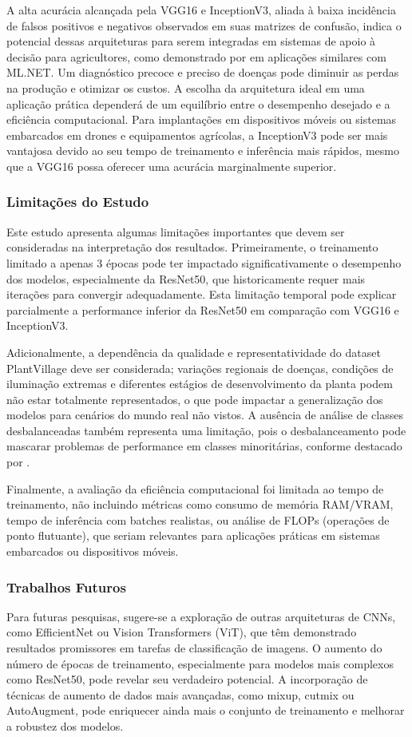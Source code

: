 \documentclass[12pt]{article}
\begin{document}
A alta acurácia alcançada pela VGG16 e InceptionV3, aliada à baixa incidência de falsos positivos e negativos observados em suas matrizes de confusão, indica o potencial dessas arquiteturas para serem integradas em sistemas de apoio à decisão para agricultores, como demonstrado por \cite{tessele2024modelo} em aplicações similares com ML.NET. Um diagnóstico precoce e preciso de doenças pode diminuir as perdas na produção e otimizar os custos. A escolha da arquitetura ideal em uma aplicação prática dependerá de um equilíbrio entre o desempenho desejado e a eficiência computacional. Para implantações em dispositivos móveis ou sistemas embarcados em drones e equipamentos agrícolas, a InceptionV3 pode ser mais vantajosa devido ao seu tempo de treinamento e inferência mais rápidos, mesmo que a VGG16 possa oferecer uma acurácia marginalmente superior. 

\subsubsection*{Limitações do Estudo}
Este estudo apresenta algumas limitações importantes que devem ser consideradas na interpretação dos resultados. Primeiramente, o treinamento limitado a apenas 3 épocas pode ter impactado significativamente o desempenho dos modelos, especialmente da ResNet50, que historicamente requer mais iterações para convergir adequadamente. Esta limitação temporal pode explicar parcialmente a performance inferior da ResNet50 em comparação com VGG16 e InceptionV3.

Adicionalmente, a dependência da qualidade e representatividade do dataset PlantVillage deve ser considerada; variações regionais de doenças, condições de iluminação extremas e diferentes estágios de desenvolvimento da planta podem não estar totalmente representados, o que pode impactar a generalização dos modelos para cenários do mundo real não vistos. A ausência de análise de classes desbalanceadas também representa uma limitação, pois o desbalanceamento pode mascarar problemas de performance em classes minoritárias, conforme destacado por \cite{tessele2024modelo}.

Finalmente, a avaliação da eficiência computacional foi limitada ao tempo de treinamento, não incluindo métricas como consumo de memória RAM/VRAM, tempo de inferência com batches realistas, ou análise de FLOPs (operações de ponto flutuante), que seriam relevantes para aplicações práticas em sistemas embarcados ou dispositivos móveis.

\subsubsection*{Trabalhos Futuros}
Para futuras pesquisas, sugere-se a exploração de outras arquiteturas de CNNs, como EfficientNet ou Vision Transformers (ViT), que têm demonstrado resultados promissores em tarefas de classificação de imagens. O aumento do número de épocas de treinamento, especialmente para modelos mais complexos como ResNet50, pode revelar seu verdadeiro potencial. A incorporação de técnicas de aumento de dados mais avançadas, como mixup, cutmix ou AutoAugment, pode enriquecer ainda mais o conjunto de treinamento e melhorar a robustez dos modelos.
\end{document}
